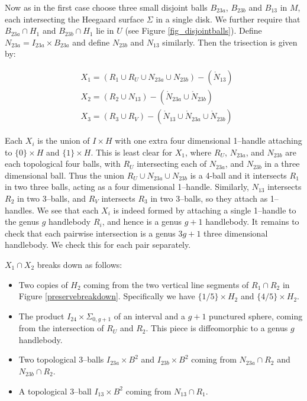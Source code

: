 \documentclass[12pt]{amsart}
\theoremstyle{definition}
\theoremstyle{remark}
\begin{document}
Now as in the first case choose three small disjoint balls $B_{23a}$, $B_{23b}$ and $B_{13}$ in $M$, each intersecting the Heegaard surface $\Sigma$ in a single disk.
We further require that $B_{23a} \cap H_1$ and $B_{23b} \cap H_1$ lie in $U$ (see Figure \ref{fig_disjointballs}).
Define $N_{23a} = I_{23a} \times B_{23a}$ and define $N_{23b}$ and $N_{13}$ similarly.
Then the trisection is given by:

\begin{align*}
&X_1 = (R_1 \cup R_U \cup N_{23a} \cup N_{23b}) - (\mathring N_{13}) \\
&X_2 = (R_2 \cup N_{13}) - (\mathring N_{23a} \cup \mathring N_{23b}) \\
&X_3 = (R_3 \cup R_V) - (\mathring N_{13} \cup \mathring N_{23a} \cup \mathring N_{23b})
\end{align*}

Each $X_i$ is the union of $I \times H$ with one extra four dimensional 1--handle attaching to $\{0\} \times H$ and $\{1\} \times H$.
This is least clear for $X_1$, where $R_U$, $N_{23a}$, and $N_{23b}$ are each topological four balls, with $R_U$ intersecting each of $N_{23a}$, and $N_{23b}$ in a three dimensional ball.
Thus the union $R_U \cup N_{23a} \cup N_{23b}$ is a 4-ball and it intersects $R_1$ in two three balls, acting as a four dimensional 1--handle.
Similarly, $N_{13}$ intersects $R_2$ in two 3--balls, and $R_V$ intersects $R_3$ in two 3--balls, so they attach as 1--handles.
 We see that each $X_i$ is indeed formed by attaching a single 1--handle to the genus $g$ handlebody $R_i$, and hence is a genus $g+1$ handlebody.
It remains to check that each pairwise intersection is a genus $3g+1$ three dimensional handlebody.
We check this for each pair separately.

$X_1 \cap X_2$ breaks down as follows:

\begin{itemize}
\item Two copies of $H_2$ coming from the two vertical line segments of $R_1 \cap R_2$ in Figure \ref{preservebreakdown}.
Specifically we have $\{1/5\} \times H_2$ and $\{4/5\} \times H_2$.
\item The product $I_{24} \times \Sigma_{0,g+1}$ of an interval and a $g+1$ punctured sphere, coming from the intersection of $R_U$ and $R_2$.
This piece is diffeomorphic to a genus $g$ handlebody.
\item Two topological 3--balls $I_{23a} \times B^2$ and $I_{23b} \times B^2$ coming from $N_{23a} \cap R_2$ and $N_{23b} \cap R_2$.
\item A topological 3--ball $I_{13} \times B^2$ coming from $N_{13} \cap R_1$.
\end{itemize}
\end{document}
